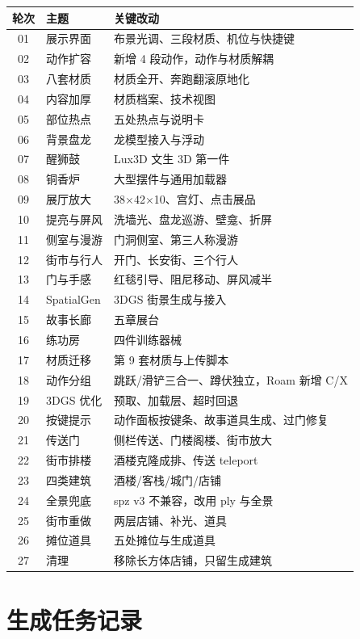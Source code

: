 \documentclass[UTF8,a4paper,11pt]{ctexart}
\begin{document}
\begin{longtable}{@{}clp{9.4cm}@{}}
\toprule
轮次 & 主题 & 关键改动 \\
\midrule
\endhead
01 & 展示界面 & 布景光调、三段材质、机位与快捷键 \\
02 & 动作扩容 & 新增 4 段动作，动作与材质解耦 \\
03 & 八套材质 & 材质全开、奔跑翻滚原地化 \\
04 & 内容加厚 & 材质档案、技术视图 \\
05 & 部位热点 & 五处热点与说明卡 \\
06 & 背景盘龙 & 龙模型接入与浮动 \\
07 & 醒狮鼓 & Lux3D 文生 3D 第一件 \\
08 & 铜香炉 & 大型摆件与通用加载器 \\
09 & 展厅放大 & 38$\times$42$\times$10、宫灯、点击展品 \\
10 & 提亮与屏风 & 洗墙光、盘龙巡游、壁龛、折屏 \\
11 & 侧室与漫游 & 门洞侧室、第三人称漫游 \\
12 & 街市与行人 & 开门、长安街、三个行人 \\
13 & 门与手感 & 红毯引导、阻尼移动、屏风减半 \\
14 & SpatialGen & 3DGS 街景生成与接入 \\
15 & 故事长廊 & 五章展台 \\
16 & 练功房 & 四件训练器械 \\
17 & 材质迁移 & 第 9 套材质与上传脚本 \\
18 & 动作分组 & 跳跃/滑铲三合一、蹲伏独立，Roam 新增 C/X \\
19 & 3DGS 优化 & 预取、加载层、超时回退 \\
20 & 按键提示 & 动作面板按键条、故事道具生成、过门修复 \\
21 & 传送门 & 侧栏传送、门楼阁楼、街市放大 \\
22 & 街市排楼 & 酒楼克隆成排、传送 teleport \\
23 & 四类建筑 & 酒楼/客栈/城门/店铺 \\
24 & 全景兜底 & spz v3 不兼容，改用 ply 与全景 \\
25 & 街市重做 & 两层店铺、补光、道具 \\
26 & 摊位道具 & 五处摊位与生成道具 \\
27 & 清理 & 移除长方体店铺，只留生成建筑 \\

\bottomrule
\end{longtable}

\section{生成任务记录}
\end{document}
